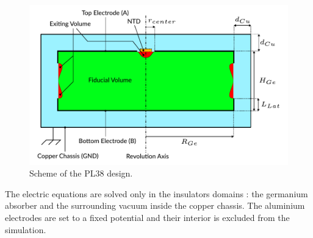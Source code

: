 \begin{figure}
\centering
\includegraphics[scale=1]{Figures/Electrodes/scheme_pl38.pdf}
\caption{
Scheme of the PL38 design.
}
\label{fig:pl38-scheme}
\end{figure}


The electric equations are solved only in the insulators domains : the germanium absorber and the surrounding vacuum inside the copper chassis. The aluminium electrodes are set to a fixed potential and their interior is excluded from the simulation. 


